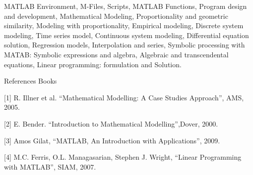 MATLAB Environment, M-Files, Scripts, MATLAB Functions, Program design and development, Mathematical Modeling, Proportionality and geometric similarity, Modeling with proportionality, Empirical modeling, Discrete system modeling, Time series model, Continuous system modeling, Differential equation solution, Regression models, Interpolation and series, Symbolic processing with MATAB: Symbolic expressions and algebra, Algebraic and transcendental equations, Linear programming: formulation and Solution. 

 

References Books  

[1] R. Illner et al. “Mathematical Modelling: A Case Studies Approach”, AMS, 2005.  

[2] E. Bender. “Introduction to Mathematical Modelling”,Dover, 2000.  

[3] Amos Gilat, “MATLAB, An Introduction with Applications”, 2009. 

[4] M.C. Ferris, O.L. Managasarian, Stephen J. Wright, “Linear Programming with MATLAB”, SIAM, 2007. 

